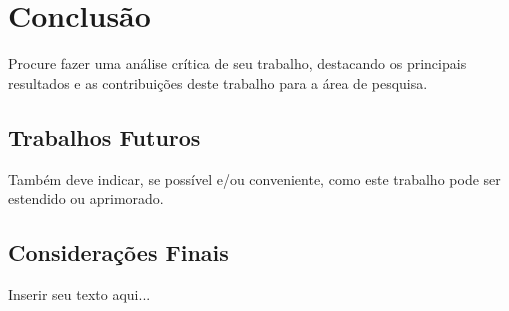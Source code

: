 
\chapter{Conclusão}
\label{chap:conclusao}

Procure fazer uma análise crítica de seu trabalho, destacando os principais resultados e as contribuições deste trabalho para a área de pesquisa.

\section{Trabalhos Futuros}
\label{sec:trabalhos_futuros}

Também deve indicar, se possível e/ou conveniente, como este trabalho pode ser estendido ou aprimorado.

\section{Considerações Finais}
\label{sec:consideracoes_finais}

Inserir seu texto aqui...

